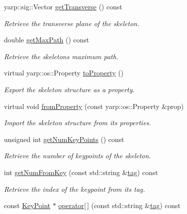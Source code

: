 \begin{DoxyCompactItemize}
yarp\+::sig\+::\+Vector \hyperlink{classassistive__rehab_1_1Skeleton_a35c3cdea575eb474a2cb8e0186011cff}{get\+Transverse} () const
\begin{DoxyCompactList}\small\item\em Retrieve the transverse plane of the skeleton. \end{DoxyCompactList}\item 
double \hyperlink{classassistive__rehab_1_1Skeleton_acda9030cd2ed3ad92697418a5e2cff7c}{get\+Max\+Path} () const
\begin{DoxyCompactList}\small\item\em Retrieve the skeleton\textquotesingle{}s maximum path. \end{DoxyCompactList}\item 
virtual yarp\+::os\+::\+Property \hyperlink{classassistive__rehab_1_1Skeleton_ad58ea53a165abc3f39a3c46594f0560f}{to\+Property} ()
\begin{DoxyCompactList}\small\item\em Export the skeleton structure as a property. \end{DoxyCompactList}\item 
virtual void \hyperlink{classassistive__rehab_1_1Skeleton_ac844f66503de87859833056dc33a835b}{from\+Property} (const yarp\+::os\+::\+Property \&prop)
\begin{DoxyCompactList}\small\item\em Import the skeleton structure from its properties. \end{DoxyCompactList}\item 
unsigned int \hyperlink{classassistive__rehab_1_1Skeleton_ac5e5b98f2c9178f6e0def5033e27922f}{get\+Num\+Key\+Points} () const
\begin{DoxyCompactList}\small\item\em Retrieve the number of keypoints of the skeleton. \end{DoxyCompactList}\item 
int \hyperlink{classassistive__rehab_1_1Skeleton_a954bfa99e0dad997ca6d93495246d3f1}{get\+Num\+From\+Key} (const std\+::string \&\hyperlink{classassistive__rehab_1_1Skeleton_a3d1ce5280300e012826948dc4383c2cb}{tag}) const
\begin{DoxyCompactList}\small\item\em Retrieve the index of the keypoint from its tag. \end{DoxyCompactList}\item 
const \hyperlink{classassistive__rehab_1_1KeyPoint}{Key\+Point} $\ast$ \hyperlink{classassistive__rehab_1_1Skeleton_a3ecc7418af653c88e40d41bb379b7271}{operator\mbox{[}$\,$\mbox{]}} (const std\+::string \&\hyperlink{classassistive__rehab_1_1Skeleton_a3d1ce5280300e012826948dc4383c2cb}{tag}) const

\end{DoxyCompactItemize}
